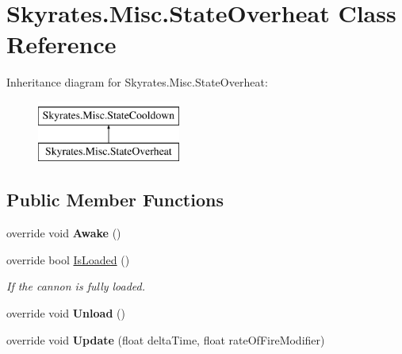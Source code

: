 \hypertarget{class_skyrates_1_1_misc_1_1_state_overheat}{\section{Skyrates.\-Misc.\-State\-Overheat Class Reference}
\label{class_skyrates_1_1_misc_1_1_state_overheat}
}
Inheritance diagram for Skyrates.\-Misc.\-State\-Overheat\-:\begin{figure}[H]
\begin{center}
\leavevmode
\includegraphics[height=2.000000cm]{class_skyrates_1_1_misc_1_1_state_overheat}
\end{center}
\end{figure}
\subsection*{Public Member Functions}
\begin{DoxyCompactItemize}
\item 
\hypertarget{class_skyrates_1_1_misc_1_1_state_overheat_a0970cf98769341314c8c00c32140012a}{override void {\bfseries Awake} ()}\label{class_skyrates_1_1_misc_1_1_state_overheat_a0970cf98769341314c8c00c32140012a}

\item 
override bool \hyperlink{class_skyrates_1_1_misc_1_1_state_overheat_a14fddc721c07b8fa2530abaaba7fe15c}{Is\-Loaded} ()
\begin{DoxyCompactList}\small\item\em If the cannon is fully loaded. \end{DoxyCompactList}\item 
\hypertarget{class_skyrates_1_1_misc_1_1_state_overheat_a431bcfe7ccd3b22b460b17bc6bf44f11}{override void {\bfseries Unload} ()}\label{class_skyrates_1_1_misc_1_1_state_overheat_a431bcfe7ccd3b22b460b17bc6bf44f11}

\item 
\hypertarget{class_skyrates_1_1_misc_1_1_state_overheat_aa3bd02fa6b8c03da0b8d9e3f86946d2d}{override void {\bfseries Update} (float delta\-Time, float rate\-Of\-Fire\-Modifier)}\label{class_skyrates_1_1_misc_1_1_state_overheat_aa3bd02fa6b8c03da0b8d9e3f86946d2d}

\end{DoxyCompactItemize}
